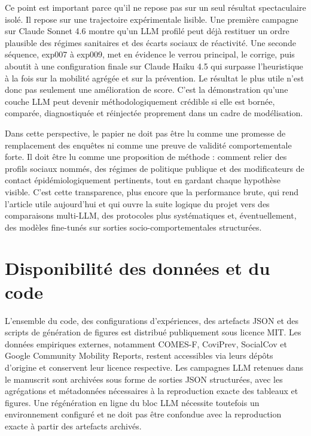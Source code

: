 \documentclass[ROIA,Unicode]{cedram}
\begin{document}
Ce point est important parce qu'il ne repose pas sur un seul résultat spectaculaire isolé. Il repose sur une trajectoire expérimentale lisible. Une première campagne sur Claude Sonnet 4.6 montre qu'un LLM profilé peut déjà restituer un ordre plausible des régimes sanitaires et des écarts sociaux de réactivité. Une seconde séquence, exp007 à exp009, met en évidence le verrou principal, le corrige, puis aboutit à une configuration finale sur Claude Haiku 4.5 qui surpasse l'heuristique à la fois sur la mobilité agrégée et sur la prévention. Le résultat le plus utile n'est donc pas seulement une amélioration de score. C'est la démonstration qu'une couche LLM peut devenir méthodologiquement crédible si elle est bornée, comparée, diagnostiquée et réinjectée proprement dans un cadre de modélisation.

Dans cette perspective, le papier ne doit pas être lu comme une promesse de remplacement des enquêtes ni comme une preuve de validité comportementale forte. Il doit être lu comme une proposition de méthode : comment relier des profils sociaux nommés, des régimes de politique publique et des modificateurs de contact épidémiologiquement pertinents, tout en gardant chaque hypothèse visible. C'est cette transparence, plus encore que la performance brute, qui rend l'article utile aujourd'hui et qui ouvre la suite logique du projet vers des comparaisons multi-LLM, des protocoles plus systématiques et, éventuellement, des modèles fine-tunés sur sorties socio-comportementales structurées.



\section*{Disponibilité des données et du code}
L'ensemble du code, des configurations d'expériences, des artefacts JSON et des scripts de génération de figures est distribué publiquement sous licence MIT. Les données empiriques externes, notamment COMES-F, CoviPrev, SocialCov et Google Community Mobility Reports, restent accessibles via leurs dépôts d'origine et conservent leur licence respective. Les campagnes LLM retenues dans le manuscrit sont archivées sous forme de sorties JSON structurées, avec les agrégations et métadonnées nécessaires à la reproduction exacte des tableaux et figures. Une régénération en ligne du bloc LLM nécessite toutefois un environnement configuré et ne doit pas être confondue avec la reproduction exacte à partir des artefacts archivés.
\end{document}
